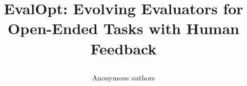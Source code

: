 \documentclass{article}
\title{\raggedright EvalOpt: Evolving Evaluators for Open-Ended Tasks with Human Feedback}
\author{Anonymous authors}
\begin{document}
\maketitle
\begin{abstract}

\end{abstract}








\clearpage
\label{first-post-main-page}




\clearpage
\appendix

\end{document}
